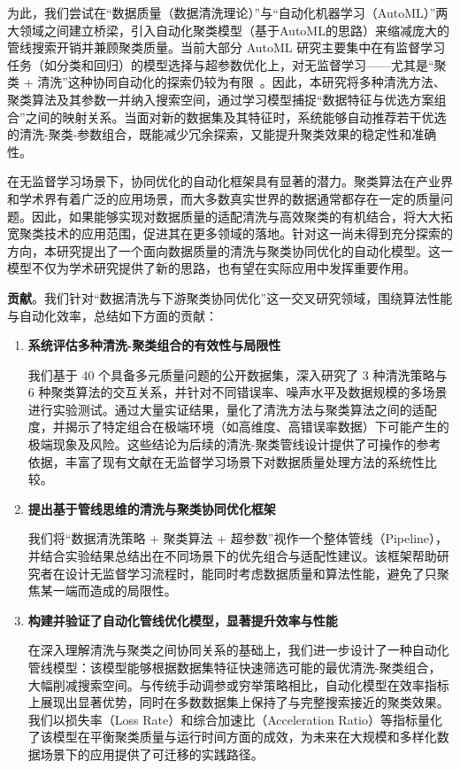 \documentclass[10pt]{article} %
\numberwithin{equation}{section}
\begin{document}
为此，我们尝试在“数据质量（数据清洗理论）”与“自动化机器学习（AutoML）”两大领域之间建立桥梁，引入自动化聚类模型（基于AutoML的思路）来缩减庞大的管线搜索开销并兼顾聚类质量。当前大部分 AutoML 研究主要集中在有监督学习任务（如分类和回归）的模型选择与超参数优化上，对无监督学习——尤其是“聚类 + 清洗”这种协同自动化的探索仍较为有限~\cite{ref13, ref14}。因此，本研究将多种清洗方法、聚类算法及其参数一并纳入搜索空间，通过学习模型捕捉“数据特征与优选方案组合”之间的映射关系。当面对新的数据集及其特征时，系统能够自动推荐若干优选的清洗-聚类-参数组合，既能减少冗余探索，又能提升聚类效果的稳定性和准确性。

在无监督学习场景下，协同优化的自动化框架具有显著的潜力。聚类算法在产业界和学术界有着广泛的应用场景，而大多数真实世界的数据通常都存在一定的质量问题。因此，如果能够实现对数据质量的适配清洗与高效聚类的有机结合，将大大拓宽聚类技术的应用范围，促进其在更多领域的落地。针对这一尚未得到充分探索的方向，本研究提出了一个面向数据质量的清洗与聚类协同优化的自动化模型。这一模型不仅为学术研究提供了新的思路，也有望在实际应用中发挥重要作用。

\textbf{贡献}。我们针对“数据清洗与下游聚类协同优化”这一交叉研究领域，围绕算法性能与自动化效率，总结如下方面的贡献：
\begin{enumerate}
    \item \textbf{系统评估多种清洗-聚类组合的有效性与局限性}  

    我们基于 40 个具备多元质量问题的公开数据集，深入研究了 3 种清洗策略与 6 种聚类算法的交互关系，并针对不同错误率、噪声水平及数据规模的多场景进行实验测试。通过大量实证结果，量化了清洗方法与聚类算法之间的适配度，并揭示了特定组合在极端环境（如高维度、高错误率数据）下可能产生的极端现象及风险。这些结论为后续的清洗-聚类管线设计提供了可操作的参考依据，丰富了现有文献在无监督学习场景下对数据质量处理方法的系统性比较。

    \item \textbf{提出基于管线思维的清洗与聚类协同优化框架}  

    我们将“数据清洗策略 + 聚类算法 + 超参数”视作一个整体管线（Pipeline），并结合实验结果总结出在不同场景下的优先组合与适配性建议。该框架帮助研究者在设计无监督学习流程时，能同时考虑数据质量和算法性能，避免了只聚焦某一端而造成的局限性。

    \item \textbf{构建并验证了自动化管线优化模型，显著提升效率与性能}  

    在深入理解清洗与聚类之间协同关系的基础上，我们进一步设计了一种自动化管线模型：该模型能够根据数据集特征快速筛选可能的最优清洗-聚类组合，大幅削减搜索空间。与传统手动调参或穷举策略相比，自动化模型在效率指标上展现出显著优势，同时在多数数据集上保持了与完整搜索接近的聚类效果。我们以损失率（Loss Rate）和综合加速比（Acceleration Ratio）等指标量化了该模型在平衡聚类质量与运行时间方面的成效，为未来在大规模和多样化数据场景下的应用提供了可迁移的实践路径。

\end{enumerate}
\end{document}
